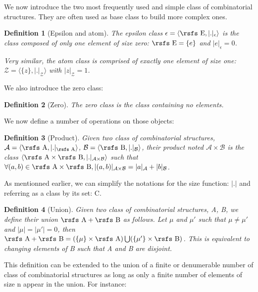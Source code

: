 \documentclass{article}
\newtheorem{definition}{Definition}
\begin{document}
We now introduce the two most frequently used and simple class of combinatorial structures. They are often used as base class to build more complex ones.
\begin{definition}[Epsilon and atom]
The epsilon class $\epsilon = \langle\text{\rsfs E},|.|_{\epsilon}\rangle$ is the class composed of only one element of size zero: $\text{\rsfs E} = \{e\}$ and $|e|_{\epsilon} = 0$.

Very similar, the atom class is comprised of exactly one element of size one: $\mathcal{Z} = \langle \{z\}, |.|_{\mathcal{Z}} \rangle$ with $|z|_{\mathcal{Z}} = 1$.
\end{definition}

We also introduce the zero class:
\begin{definition}[Zero]
The zero class is the class containing no elements.
\end{definition}

We now define a number of operations on those objects:

\begin{definition}[Product]
Given two class of combinatorial structures, $\mathcal{A} = \langle \text{\rsfs A}, |.|_{\text{\rsfs A}} \rangle$, $\mathcal{B} = \langle \text{\rsfs B}, |.|_{\mathcal{B}} \rangle$, their product noted $\mathcal{A} \times \mathcal{B}$ is the class $\langle \text{\rsfs A} \times \text{\rsfs B}, |.|_{\mathcal{A} \times \mathcal{B}} \rangle$ such that $\forall (a,b) \in \text{\rsfs A} \times \text{\rsfs B}, |(a,b)|_{\mathcal{A} \times \mathcal{B}} = |a|_{\mathcal{A}} + |b|_{\mathcal{B}}$.
\end{definition}

As mentionned earlier, we can simplify the notations for the size function: $|.|$ and referring as a class by its set: {\rsfs C}.

\begin{definition}[Union]
Given two class of combinatorial structures, {\rsfs A}, {\rsfs B}, we define their union $\text{\rsfs A} + \text{\rsfs B}$ as follows. Let $\mu$ and $\mu'$ such that $\mu \ne \mu'$ and $|\mu| = |\mu'| = 0$, then $\text{\rsfs A} + \text{\rsfs B} = (\{\mu\} \times \text{\rsfs A})\bigcup(\{\mu'\} \times \text{\rsfs B})$. This is equivalent to changing elements of {\rsfs B} such that {\rsfs A} and {\rsfs B} are disjoint.
\end{definition}

This definition can be extended to the union of a finite or denumerable number of class of combinatorial structures as long as only a finite number of elements of size n appear in the union. For instance:
\end{document}
